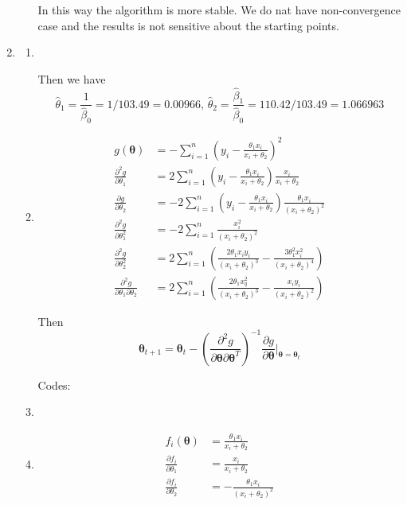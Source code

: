 \documentclass{article}
\begin{document}
\begin{enumerate}[leftmargin = 0 em, label = \arabic*., font = \bfseries]
\begin{enumerate}
		In this way the algorithm is more stable. We do nat have non-convergence case and the results is not sensitive about the starting points.


	
	\end{enumerate}

	\item 
	\begin{enumerate}
		\item \ 
		

		Then we have 
		\[\hat{\theta}_1 = \frac{1}{\hat{\beta}_0} = 1/103.49 = 0.00966,\, \hat{\theta}_2 = \frac{\hat{\beta}_1}{\hat{\beta}_0} = 110.42 / 103.49 = 1.066963\]

		\item 
		\begin{align*}
		g(\bm \theta) & = - \sum_{i=1}^n \left( y_i - \frac{\theta_1 x_i}{x_i + \theta_2} \right)^2\\
		\frac{\partial^2 g}{\partial \theta_1} &= 2 \sum_{i=1}^n \left( y_i - \frac{\theta_1 x_i}{x_i + \theta_2} \right) \frac{x_i}{x_i + \theta_2}\\
		\frac{\partial g}{\partial \theta_2} &= -2 \sum_{i=1}^n \left( y_i - \frac{\theta_1 x_i}{x_i + \theta_2} \right) \frac{\theta_1 x_i}{(x_i + \theta_2)^2} \\
		\frac{\partial^2 g}{\partial \theta_1^2} & = -2 \sum_{i=1}^n \frac{x_i^2}{(x_i + \theta_2)^2}\\
		\frac{\partial^2 g}{\partial \theta_2^2} & = 2 \sum_{i=1}^n \left( \frac{2 \theta_1 x_i y_i}{(x_i + \theta_2)^3} - \frac{3 \theta_1^2 x_i^2}{(x_i + \theta_2)^4} \right)\\
		\frac{\partial^2 g}{\partial \theta_1 \partial \theta_2} &= 2 \sum_{i=1}^n \left( \frac{2 \theta_1 x_q^2}{(x_i + \theta_2)^3} - \frac{x_i y_i}{(x_i + \theta_2)^2} \right)  
		\end{align*}

		Then 
		\[\bm \theta_{t+1} = \bm \theta_{t} - \left(\frac{\partial^2 g}{\partial \bm \theta \partial \bm \theta^T}\right)^{-1} \frac{\partial g}{\partial \bm \theta}\bigg|_{\bm \theta = \bm \theta_t}\]

		Codes:

		
		
		\item \ 

		

		\item 
		\begin{align*}
		f_i (\bm \theta) & = \frac{\theta_1 x_i}{x_i + \theta_2}\\
		\frac{\partial f_i}{\partial \theta_1} & = \frac{x_i}{x_i + \theta_2}\\
		\frac{\partial f_i}{\partial \theta_2} & = - \frac{\theta_1 x_i}{(x_i + \theta_2)^2}
		\end{align*}


\end{enumerate}
\end{enumerate}
\end{document}
